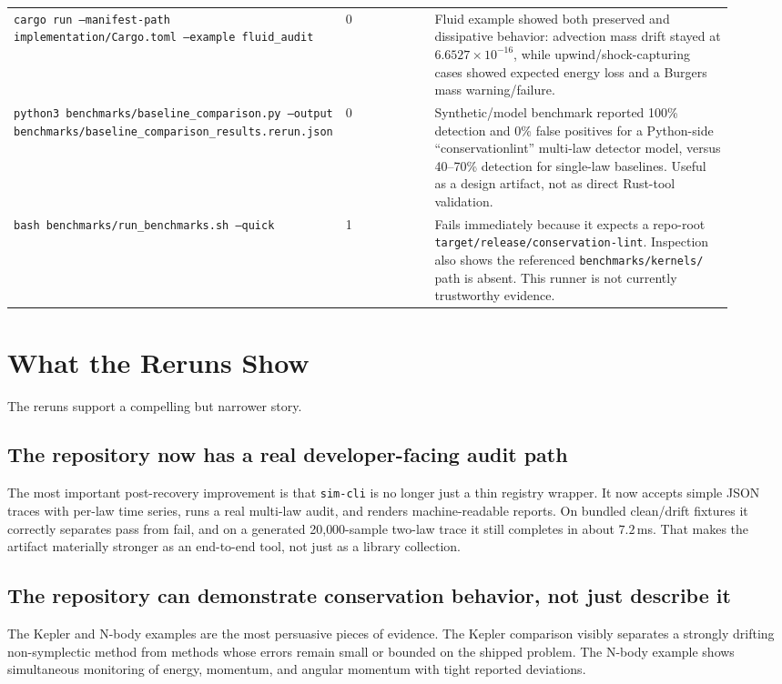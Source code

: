 \documentclass[11pt]{article}
\begin{document}
\begin{longtable}{p{0.29\linewidth}p{0.16\linewidth}p{0.47\linewidth}}
\texttt{cargo run --manifest-path implementation/Cargo.toml --example fluid\_audit} & 0 & Fluid example showed both preserved and dissipative behavior: advection mass drift stayed at $6.6527\times10^{-16}$, while upwind/shock-capturing cases showed expected energy loss and a Burgers mass warning/failure. \\
\texttt{python3 benchmarks/baseline\_comparison.py --output benchmarks/baseline\_comparison\_results.rerun.json} & 0 & Synthetic/model benchmark reported 100\% detection and 0\% false positives for a Python-side ``conservationlint'' multi-law detector model, versus 40--70\% detection for single-law baselines. Useful as a design artifact, not as direct Rust-tool validation. \\
\texttt{bash benchmarks/run\_benchmarks.sh --quick} & 1 & Fails immediately because it expects a repo-root \texttt{target/release/conservation-lint}. Inspection also shows the referenced \texttt{benchmarks/kernels/} path is absent. This runner is not currently trustworthy evidence. \\
\bottomrule
\end{longtable}

\section{What the Reruns Show}
The reruns support a compelling but narrower story.

\subsection{The repository now has a real developer-facing audit path}
The most important post-recovery improvement is that \texttt{sim-cli} is no longer just a thin registry wrapper. It now accepts simple JSON traces with per-law time series, runs a real multi-law audit, and renders machine-readable reports. On bundled clean/drift fixtures it correctly separates pass from fail, and on a generated 20{,}000-sample two-law trace it still completes in about $7.2$\,ms. That makes the artifact materially stronger as an end-to-end tool, not just as a library collection.

\subsection{The repository can demonstrate conservation behavior, not just describe it}
The Kepler and N-body examples are the most persuasive pieces of evidence. The Kepler comparison visibly separates a strongly drifting non-symplectic method from methods whose errors remain small or bounded on the shipped problem. The N-body example shows simultaneous monitoring of energy, momentum, and angular momentum with tight reported deviations.
\end{document}
